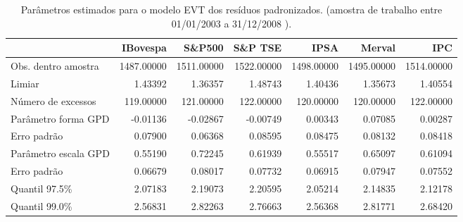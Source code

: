 \begin{table}[H]
\centering
\caption{Parâmetros estimados para o modelo EVT dos resíduos padronizados. 
               (amostra de trabalho entre 01/01/2003 a 31/12/2008 ).} 
\label{tab:evtcoef}
\begin{tabular}{lrrrrrr}
  \hline
 & IBovespa & S\&P500 & S\&P TSE & IPSA & Merval & IPC \\ 
  \hline
Obs. dentro amostra & 1487.00000 & 1511.00000 & 1522.00000 & 1498.00000 & 1495.00000 & 1514.00000 \\ 
  Limiar & 1.43392 & 1.36357 & 1.48743 & 1.40436 & 1.35673 & 1.40554 \\ 
  Número de excessos & 119.00000 & 121.00000 & 122.00000 & 120.00000 & 120.00000 & 122.00000 \\ 
  Parâmetro forma GPD & -0.01136 & -0.02867 & -0.00749 & 0.00343 & 0.07085 & 0.00287 \\ 
  Erro padrão & 0.07900 & 0.06368 & 0.08595 & 0.08475 & 0.08132 & 0.08418 \\ 
  Parâmetro escala GPD & 0.55190 & 0.72245 & 0.61939 & 0.55517 & 0.65097 & 0.61094 \\ 
  Erro padrão & 0.06679 & 0.08017 & 0.07732 & 0.06915 & 0.07947 & 0.07552 \\ 
  Quantil 97.5\% & 2.07183 & 2.19073 & 2.20595 & 2.05214 & 2.14835 & 2.12178 \\ 
  Quantil 99.0\% & 2.56831 & 2.82263 & 2.76663 & 2.56368 & 2.81771 & 2.68420 \\ 
   \hline
\end{tabular}
\end{table}
